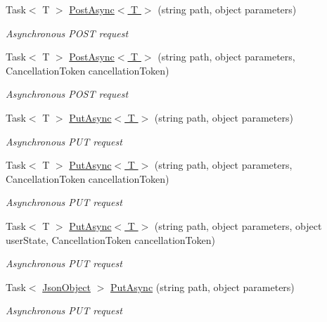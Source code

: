 \begin{DoxyCompactItemize}
Task$<$ T $>$ \hyperlink{class_accela_1_1_windows_store_s_d_k_1_1_accela_s_d_k_af779d65e80889ec2bb8e219939b9235c}{Post\+Async$<$ T $>$} (string path, object parameters)
\begin{DoxyCompactList}\small\item\em Asynchronous P\+O\+S\+T request \end{DoxyCompactList}\item 
Task$<$ T $>$ \hyperlink{class_accela_1_1_windows_store_s_d_k_1_1_accela_s_d_k_a78d57c2d6e4a1833c8edfd83f6e5f4c7}{Post\+Async$<$ T $>$} (string path, object parameters, Cancellation\+Token cancellation\+Token)
\begin{DoxyCompactList}\small\item\em Asynchronous P\+O\+S\+T request \end{DoxyCompactList}\item 
Task$<$ T $>$ \hyperlink{class_accela_1_1_windows_store_s_d_k_1_1_accela_s_d_k_a02c59d94e7cb07b4c43fb2f31bc517e9}{Put\+Async$<$ T $>$} (string path, object parameters)
\begin{DoxyCompactList}\small\item\em Asynchronous P\+U\+T request \end{DoxyCompactList}\item 
Task$<$ T $>$ \hyperlink{class_accela_1_1_windows_store_s_d_k_1_1_accela_s_d_k_a81aa603d4f9d14eed159ae219aa6b980}{Put\+Async$<$ T $>$} (string path, object parameters, Cancellation\+Token cancellation\+Token)
\begin{DoxyCompactList}\small\item\em Asynchronous P\+U\+T request \end{DoxyCompactList}\item 
Task$<$ T $>$ \hyperlink{class_accela_1_1_windows_store_s_d_k_1_1_accela_s_d_k_af36035a41d27afc717b97434d4c8c6f4}{Put\+Async$<$ T $>$} (string path, object parameters, object user\+State, Cancellation\+Token cancellation\+Token)
\begin{DoxyCompactList}\small\item\em Asynchronous P\+U\+T request \end{DoxyCompactList}\item 
Task$<$ \hyperlink{class_accela_1_1_windows_store_s_d_k_1_1_json_object}{Json\+Object} $>$ \hyperlink{class_accela_1_1_windows_store_s_d_k_1_1_accela_s_d_k_a9c550cc37a21893a9e955dc3132c2801}{Put\+Async} (string path, object parameters)
\begin{DoxyCompactList}\small\item\em Asynchronous P\+U\+T request \end{DoxyCompactList}\item 

\end{DoxyCompactItemize}
